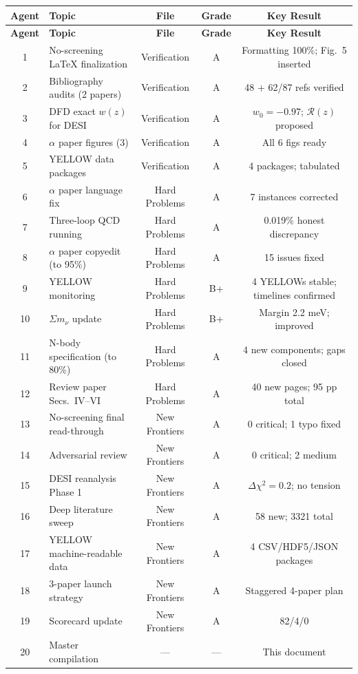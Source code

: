 \documentclass[11pt,a4paper]{article}
\begin{document}
\begin{center}
\begin{longtable}{clccc}
\toprule
\textbf{Agent} & \textbf{Topic} & \textbf{File} & \textbf{Grade} & \textbf{Key Result} \\
\midrule
\endfirsthead
\toprule
\textbf{Agent} & \textbf{Topic} & \textbf{File} & \textbf{Grade} & \textbf{Key Result} \\
\midrule
\endhead
1 & No-screening LaTeX finalization & Verification & A & Formatting 100\%; Fig.~5 inserted \\
2 & Bibliography audits (2 papers) & Verification & A & 48 + 62/87 refs verified \\
3 & DFD exact $w(z)$ for DESI & Verification & A & $w_0 = -0.97$; $\mathcal{R}(z)$ proposed \\
4 & $\alpha$ paper figures (3) & Verification & A & All 6 figs ready \\
5 & YELLOW data packages & Verification & A & 4 packages; tabulated \\
\midrule
6 & $\alpha$ paper language fix & Hard Problems & A & 7 instances corrected \\
7 & Three-loop QCD running & Hard Problems & A & 0.019\% honest discrepancy \\
8 & $\alpha$ paper copyedit (to 95\%) & Hard Problems & A & 15 issues fixed \\
9 & YELLOW monitoring & Hard Problems & B+ & 4 YELLOWs stable; timelines confirmed \\
10 & $\Sigma m_\nu$ update & Hard Problems & B+ & Margin 2.2 meV; improved \\
11 & N-body specification (to 80\%) & Hard Problems & A & 4 new components; gaps closed \\
12 & Review paper Secs.\ IV--VI & Hard Problems & A & 40 new pages; 95 pp total \\
\midrule
13 & No-screening final read-through & New Frontiers & A & 0 critical; 1 typo fixed \\
14 & Adversarial review & New Frontiers & A & 0 critical; 2 medium \\
15 & DESI reanalysis Phase 1 & New Frontiers & A & $\Delta\chi^2 = 0.2$; no tension \\
16 & Deep literature sweep & New Frontiers & A & 58 new; 3321 total \\
17 & YELLOW machine-readable data & New Frontiers & A & 4 CSV/HDF5/JSON packages \\
18 & 3-paper launch strategy & New Frontiers & A & Staggered 4-paper plan \\
19 & Scorecard update & New Frontiers & A & 82/4/0 \\
20 & Master compilation & --- & --- & This document \\
\bottomrule
\end{longtable}
\end{center}
\end{document}
